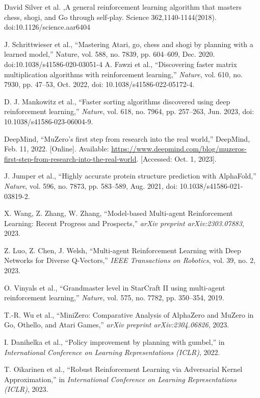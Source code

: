 \documentclass[conference]{IEEEtran}
\begin{document}
\begin{thebibliography}{00}
     David Silver et al. ,A general reinforcement learning algorithm that masters chess, shogi, and Go through self-play. Science 362,1140-1144(2018). doi:10.1126/science.aar6404

     J. Schrittwieser et al., “Mastering Atari, go, chess and shogi by planning with a learned model,” Nature, vol. 588, no. 7839, pp. 604–609, Dec. 2020. doi:10.1038/s41586-020-03051-4 
    A. Fawzi et al., ``Discovering faster matrix multiplication algorithms with reinforcement learning,'' \textit{Nature}, vol. 610, no. 7930, pp. 47--53, Oct. 2022, doi: 10.1038/s41586-022-05172-4.
    
    D. J. Mankowitz et al., ``Faster sorting algorithms discovered using deep reinforcement learning,'' \textit{Nature}, vol. 618, no. 7964, pp. 257–263, Jun. 2023, doi: 10.1038/s41586-023-06004-9.
    
    DeepMind, ``MuZero's first step from research into the real world,'' DeepMind, Feb. 11, 2022. [Online]. Available: \url{https://www.deepmind.com/blog/muzeros-first-step-from-research-into-the-real-world}. [Accessed: Oct. 1, 2023].
    
    J. Jumper et al., ``Highly accurate protein structure prediction with AlphaFold,'' \textit{Nature}, vol. 596, no. 7873, pp. 583–589, Aug. 2021, doi: 10.1038/s41586-021-03819-2.

    
     X. Wang, Z. Zhang, W. Zhang, ``Model-based Multi-agent Reinforcement Learning: Recent Progress and Prospects,'' \textit{arXiv preprint arXiv:2303.07883}, 2023.

     Z. Luo, Z. Chen, J. Welsh, ``Multi-agent Reinforcement Learning with Deep Networks for Diverse Q-Vectors,'' \textit{IEEE Transactions on Robotics}, vol. 39, no. 2, 2023.
    
     O. Vinyals et al., ``Grandmaster level in StarCraft II using multi-agent reinforcement learning,'' \textit{Nature}, vol. 575, no. 7782, pp. 350–354, 2019.
    
     T.-R. Wu et al., ``MiniZero: Comparative Analysis of AlphaZero and MuZero in Go, Othello, and Atari Games,'' \textit{arXiv preprint arXiv:2304.06826}, 2023.
    
     I. Danihelka et al., ``Policy improvement by planning with gumbel,'' in \textit{International Conference on Learning Representations (ICLR)}, 2022.
    
     T. Oikarinen et al., ``Robust Reinforcement Learning via Adversarial Kernel Approximation,'' in \textit{International Conference on Learning Representations (ICLR)}, 2023.



\end{thebibliography}
\vspace{12pt}
\end{document}
